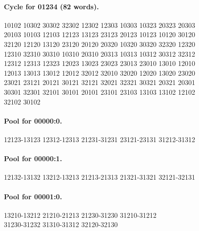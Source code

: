 \documentclass[11pt]{article}
\theoremstyle{remark}
\numberwithin{equation}{section}
\numberwithin{table}{section}
\begin{document}
\paragraph{Cycle for 01234 (82 words).}
\begingroup\footnotesize\ttfamily\begin{flushleft}
10102 10302 30302 32302 12302 12303 10303 10323 20323 20303\\
20103 10103 12103 12123 13123 23123 20123 10123 10120 30120\\
32120 12120 13120 23120 20120 20320 10320 30320 32320 12320\\
12310 32310 30310 10310 20310 20313 10313 10312 30312 32312\\
12312 12313 12323 12023 13023 23023 23013 23010 13010 12010\\
12013 13013 13012 12012 32012 32010 32020 12020 13020 23020\\
23021 23121 20121 30121 32121 32021 32321 30321 20321 20301\\
30301 32301 32101 30101 20101 23101 23103 13103 13102 12102\\
32102 30102\\
\end{flushleft}\endgroup
\paragraph{Pool for 00000:0.}
\begingroup\footnotesize\ttfamily\begin{flushleft}
12123-13123 12312-12313 21231-31231 23121-23131 31212-31312\\
\end{flushleft}\endgroup
\paragraph{Pool for 00000:1.}
\begingroup\footnotesize\ttfamily\begin{flushleft}
12132-13132 13212-13213 21213-21313 21321-31321 32121-32131\\
\end{flushleft}\endgroup
\paragraph{Pool for 00001:0.}
\begingroup\footnotesize\ttfamily\begin{flushleft}
13210-13212 21210-21213 21230-31230 31210-31212\\
31230-31232 31310-31312 32120-32130\\
\end{flushleft}\endgroup
\end{document}
